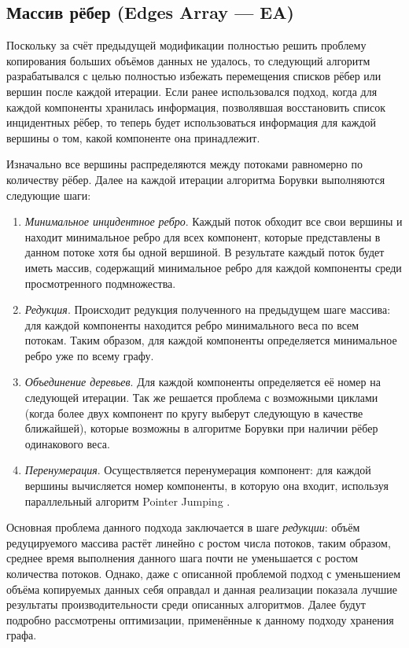\documentclass[a4paper,10pt]{extarticle}
\begin{document}
\subsection{Массив рёбер (Edges Array --- EA)}
\label{subsec:BoruvkaEA}

Поскольку за счёт предыдущей модификации полностью решить проблему копирования больших объёмов данных не удалось, то следующий алгоритм разрабатывался с целью полностью избежать перемещения списков рёбер или вершин после каждой итерации.
Если ранее использовался подход, когда для каждой компоненты хранилась информация, позволявшая восстановить список инцидентных рёбер, то теперь будет использоваться информация для каждой вершины о том, какой компоненте она принадлежит.

Изначально все вершины распределяются между потоками равномерно по количеству рёбер. Далее на каждой итерации алгоритма Борувки выполняются следующие шаги:

\begin{enumerate}
    \item \textit{Минимальное инцидентное ребро}.
		Каждый поток обходит все свои вершины и находит минимальное ребро для всех компонент, которые представлены в данном потоке хотя бы одной вершиной.
        В результате каждый поток будет иметь массив, содержащий минимальное ребро для каждой компоненты среди просмотренного подмножества.
    \item \textit{Редукция}.
          Происходит редукция полученного на предыдущем шаге массива: для каждой компоненты находится ребро минимального веса по всем потокам. 
          Таким образом, для каждой компоненты определяется минимальное ребро уже по всему графу.
    \item \textit{Объединение деревьев}.
          Для каждой компоненты определяется её номер на следующей итерации.
          Так же решается проблема с возможными циклами (когда более двух компонент по кругу выберут следующую в качестве ближайшей), которые возможны в алгоритме Борувки при наличии рёбер одинакового веса.
    \item \textit{Перенумерация}.
          Осуществляется перенумерация компонент: для каждой вершины вычисляется номер компоненты, в которую она входит, используя параллельный алгоритм Pointer Jumping \cite{pointer-jumping}.
\end{enumerate}

Основная проблема данного подхода заключается в шаге \textit{редукции}: объём редуцируемого массива растёт линейно с ростом числа потоков, таким образом, среднее время выполнения данного шага почти не уменьшается с ростом количества потоков.
Однако, даже с описанной проблемой подход с уменьшением объёма копируемых данных себя оправдал и данная реализации показала лучшие результаты производительности среди описанных алгоритмов.
Далее будут подробно рассмотрены оптимизации, применённые к данному подходу хранения графа.
\end{document}

